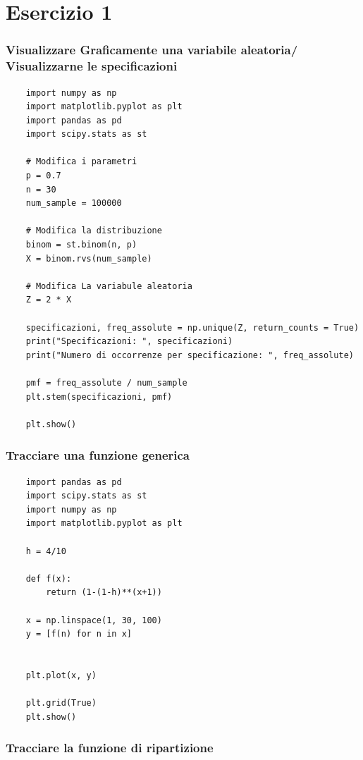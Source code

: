 \documentclass{article}
\begin{document}
\pagebreak

\section{Esercizio 1}

\subsubsection*{Visualizzare Graficamente una variabile aleatoria/ Visualizzarne le specificazioni}

\begin{lstlisting}
    import numpy as np
    import matplotlib.pyplot as plt
    import pandas as pd
    import scipy.stats as st

    # Modifica i parametri
    p = 0.7
    n = 30
    num_sample = 100000

    # Modifica la distribuzione
    binom = st.binom(n, p)
    X = binom.rvs(num_sample)

    # Modifica La variabule aleatoria
    Z = 2 * X

    specificazioni, freq_assolute = np.unique(Z, return_counts = True)
    print("Specificazioni: ", specificazioni)
    print("Numero di occorrenze per specificazione: ", freq_assolute)

    pmf = freq_assolute / num_sample
    plt.stem(specificazioni, pmf)

    plt.show()
\end{lstlisting}


\subsubsection*{Tracciare una funzione generica}

\begin{lstlisting}
    import pandas as pd
    import scipy.stats as st
    import numpy as np
    import matplotlib.pyplot as plt

    h = 4/10

    def f(x):
        return (1-(1-h)**(x+1))

    x = np.linspace(1, 30, 100)
    y = [f(n) for n in x]


    plt.plot(x, y)

    plt.grid(True)
    plt.show()
\end{lstlisting}

\pagebreak

\subsubsection*{Tracciare la funzione di ripartizione}
\end{document}
